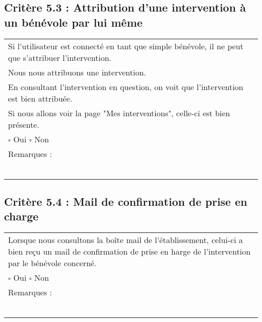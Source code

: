   	\subsection*{Critère 5.3 : Attribution d'une intervention à un bénévole par lui même}
  		\begin{center}
    	 		\begin{tabular}[h]{|p{}|}
			\hline
				Si l'utilisateur est connecté en tant que simple bénévole, il ne peut que s'attribuer l'intervention. \\
				Nous nous attribuons une intervention. \\
				En consultant l'intervention en question, on voit que l'intervention est bien attribuée. \\
				Si nous allons voir la page "Mes interventions", celle-ci est bien présente. \\
				
				$\square$ Oui  \hfill \hfill $\square$ Non \\\hline Remarques : \\ ~\\
			 \\\hline
     		\end{tabular}
  		\end{center}	
  		
  	\subsection*{Critère 5.4 : Mail de confirmation de prise en charge}
  		\begin{center}
    	 		\begin{tabular}[h]{|p{}|}
			\hline
				Lorsque nous consultons la boîte mail de l'établissement, celui-ci a bien reçu un mail de confirmation de prise en harge de l'intervention par le bénévole concerné.\\
				
				$\square$ Oui  \hfill \hfill $\square$ Non \\\hline Remarques : \\ ~\\
			 \\\hline
     		\end{tabular}
  		\end{center}	
  		
  		
